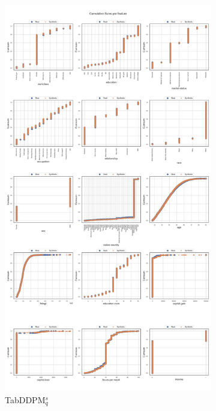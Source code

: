 \begin{landscape}
\begin{figure}[h]
		\hfill
		\begin{subfigure}{0.3\linewidth}
			\includegraphics[height=\textheight,width=\linewidth,keepaspectratio]{images/cumsums/tab-ddpm-simTune.jpg}
			\caption{TabDDPM$^{s}_q$}
		\end{subfigure}
		\hfill
		\begin{subfigure}{0.3\linewidth}

\end{subfigure}
\end{figure}
\end{landscape}

